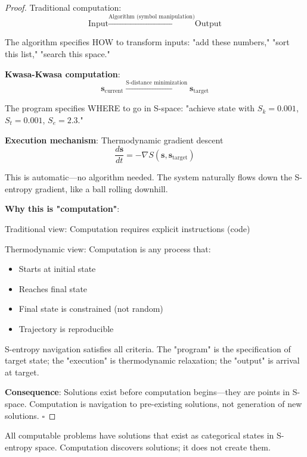 \begin{proof}
Traditional computation:
\begin{equation}
\text{Input} \xrightarrow{\text{Algorithm (symbol manipulation)}} \text{Output}
\end{equation}

The algorithm specifies HOW to transform inputs: "add these numbers," "sort this list," "search this space."

\textbf{Kwasa-Kwasa computation}:
\begin{equation}
\mathbf{s}_{\text{current}} \xrightarrow{\text{S-distance minimization}} \mathbf{s}_{\text{target}}
\end{equation}

The program specifies WHERE to go in S-space: "achieve state with $S_k = 0.001$, $S_t = 0.001$, $S_e = 2.3$."

\textbf{Execution mechanism}: Thermodynamic gradient descent
\begin{equation}
\frac{d\mathbf{s}}{dt} = -\nabla S(\mathbf{s}, \mathbf{s}_{\text{target}})
\end{equation}

This is automatic—no algorithm needed. The system naturally flows down the S-entropy gradient, like a ball rolling downhill.

\textbf{Why this is "computation"}:

Traditional view: Computation requires explicit instructions (code)

Thermodynamic view: Computation is any process that:
\begin{itemize}
\item Starts at initial state
\item Reaches final state
\item Final state is constrained (not random)
\item Trajectory is reproducible
\end{itemize}

S-entropy navigation satisfies all criteria. The "program" is the specification of target state; the "execution" is thermodynamic relaxation; the "output" is arrival at target.

\textbf{Consequence}: Solutions exist before computation begins—they are points in S-space. Computation is navigation to pre-existing solutions, not generation of new solutions. $\square$
\end{proof}

\begin{corollary}
All computable problems have solutions that exist as categorical states in S-entropy space. Computation discovers solutions; it does not create them.
\end{corollary}

